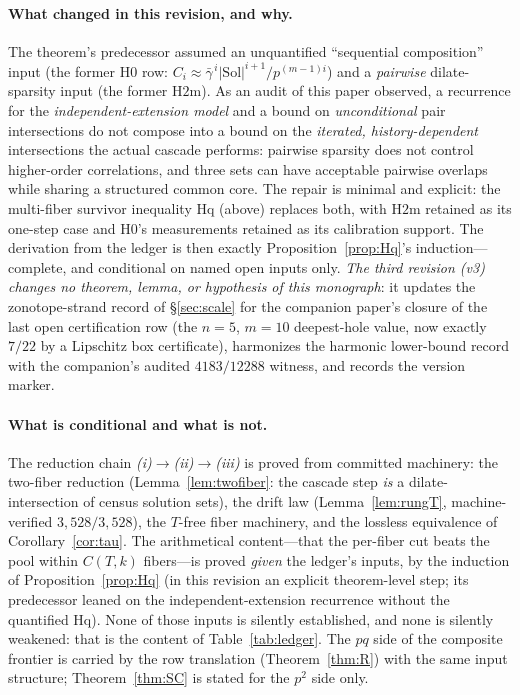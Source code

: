 \paragraph{What changed in this revision, and why.}
The theorem's predecessor assumed an unquantified ``sequential
composition'' input (the former $\mathrm{H0}$ row: $C_i\approx
\bar\gamma^{\,i}|\mathrm{Sol}|^{i+1}/p^{(m-1)i}$) and a \emph{pairwise}
dilate-sparsity input (the former $\mathrm{H2m}$). As an audit of this
paper observed, a recurrence for the \emph{independent-extension model}
and a bound on \emph{unconditional} pair intersections do not compose
into a bound on the \emph{iterated, history-dependent} intersections the
actual cascade performs: pairwise sparsity does not control
higher-order correlations, and three sets can have acceptable pairwise
overlaps while sharing a structured common core. The repair is minimal
and explicit: the multi-fiber survivor inequality $\mathrm{Hq}$ (above)
replaces both, with $\mathrm{H2m}$ retained as its one-step case and
$\mathrm{H0}$'s measurements retained as its calibration support. The
derivation from the ledger is then exactly
Proposition~\ref{prop:Hq}'s induction---complete, and conditional on
named open inputs only.
\emph{The third revision (v3) changes no theorem, lemma, or hypothesis
of this monograph}: it updates the zonotope-strand record of
\S\ref{sec:scale} for the companion paper's closure of the last open
certification row (the $n=5$, $m=10$ deepest-hole value, now exactly
$7/22$ by a Lipschitz box certificate), harmonizes the harmonic
lower-bound record with the companion's audited $4183/12288$ witness,
and records the version marker.

\paragraph{What is conditional and what is not.}
The reduction chain \emph{(i)}$\to$\emph{(ii)}$\to$\emph{(iii)} is
proved from committed machinery: the two-fiber reduction
(Lemma~\ref{lem:twofiber}: the cascade step \emph{is} a
dilate-intersection of census solution sets), the drift law
(Lemma~\ref{lem:rungT}, machine-verified $3{,}528/3{,}528$), the
$T$-free fiber machinery, and the lossless equivalence of
Corollary~\ref{cor:tau}. The arithmetical content---that the per-fiber
cut beats the pool within $C(T,k)$ fibers---is proved \emph{given} the
ledger's inputs, by the induction of Proposition~\ref{prop:Hq} (in
this revision an explicit theorem-level step; its predecessor leaned
on the independent-extension recurrence without the quantified Hq). None of those inputs is silently established, and none
is silently weakened: that is the content of Table~\ref{tab:ledger}. The
$pq$ side of the composite frontier is carried by the row translation
(Theorem~\ref{thm:R}) with the same input structure; Theorem~\ref{thm:SC}
is stated for the $p^2$ side only.

